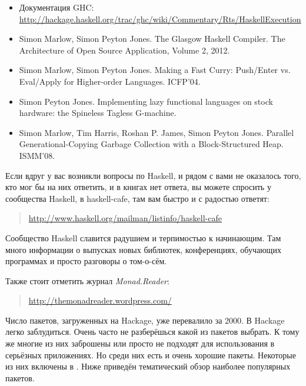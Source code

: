 \begin{itemize}
\item Документация GHC:
\url{http://hackage.haskell.org/trac/ghc/wiki/Commentary/Rts/HaskellExecution}

\item Simon Marlow, Simon Peyton Jones. The Glasgow Haskell Compiler. 
    The Architecture of Open Source Application, Volume 2, 2012.

\item Simon Marlow, Simon Peyton Jones. Making a Fast Curry: Push/Enter vs.
    Eval/Apply for Higher-order Languages. ICFP'04.

\item Simon Peyton Jones. Implementing lazy functional languages
on stock hardware: the Spineless Tagless G-machine.

\item Simon Marlow, Tim Harris, Roshan P. James, Simon Peyton Jones.
    Parallel Generational-Copying Garbage Collection with a 
    Block-Structured Heap. ISMM'08.
\end{itemize}





Если вдруг у вас возникли вопросы по Haskell, и рядом с вами не оказалось
того, кто мог бы на них ответить, и в книгах нет ответа, вы 
можете спросить у сообщества Haskell,
в haskell-cafe, там вам быстро и с радостью ответят:

\begin{quote}
\url{http://www.haskell.org/mailman/listinfo/haskell-cafe}
\end{quote}

Сообщество Haskell славится радушием и терпимостью 
к начинающим. Там много информации о выпусках новых библиотек,
конференциях, обучающих программах и просто разговоры о том-о-сём.

Также стоит отметить журнал \emph{Monad.Reader}:

\begin{quote}
\url{http://themonadreader.wordpress.com/}
\end{quote}

\newpage


Число пакетов, загруженных на Hackage, уже перевалило за 
2000. В Hackage легко заблудиться. 
Очень часто не разберёшься какой из пакетов
выбрать. К тому же многие из них заброшены или просто 
не подходят для использования в серьёзных приложениях. 
Но среди них есть и очень хорошие пакеты. Некоторые
из них включены в . 
Ниже приведён тематический обзор наиболее популярных пакетов.

